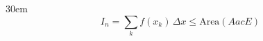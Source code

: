 \documentclass[border=4pt]{standalone}
\begin{document}
\begin{varwidth}{30em}
\large
\[ I_n=\sum_{k} f(x_k)\,\Delta x \le \text{Area}(AacE) \]

\end{varwidth}
\end{document}
